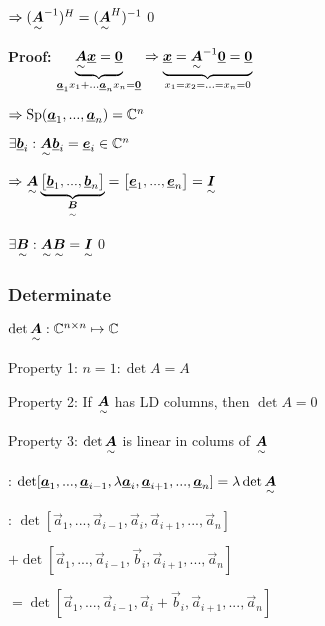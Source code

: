 $\Rightarrow(\ma{A}^{-1})^H=(\ma{A}^H)^{-1}$\qed


\textbf{Proof:} $\underbrace{\ma{A}\vec{x}=\vec{0}}_{\vec{a}_1x_1+...\vec{a}_nx_n=\vec{0}}
\Rightarrow \underbrace{\vec{x}=\ma{A}^{-1}\vec{0}=\vec{0}}_{x_1=x_2=...=x_n=0}$

$\Rightarrow \Sp(\vec{a}_1,...,\vec{a}_n)=\mathbb{C}^n$

$\exists \vec{b}_i: \ma{A}\vec{b}_i=\vec{e}_i \in \mathbb{C}^n$

$\Rightarrow \ma{A}\underbrace{\begin{bmatrix}\vec{b}_1,...,\vec{b}_n\end{bmatrix}}_{\ma{B}}=\begin{bmatrix}\vec{e}_1,...,\vec{e}_n\end{bmatrix}=\ma{I}$

$\exists \ma{B}: \ma{A}\ma{B}=\ma{I}$\qed


\subsubsection{Determinate}
$\det \ma{A}: \mathbb{C}^{n\times n}\mapsto \mathbb{C}$

Property 1: $n=1: \det A=A$

Property 2: If $\ma{A}$ has LD columns, then $\det A=0$

Property 3: $\det \ma{A}$ is linear in colums of $\ma{A}$

\quad {}: $\det [\vec{a}_1,...,\vec{a}_{i-1},\lambda\vec{a}_i,\vec{a}_{i+1},...,\vec{a}_n]=\lambda \det \ma{A}$

\quad {}: $\det [\vec{a}_1,...,\vec{a}_{i-1},\vec{a}_i,\vec{a}_{i+1},...,\vec{a}_n]$

\qquad\quad$+\det [\vec{a}_1,...,\vec{a}_{i-1},\vec{b}_i,\vec{a}_{i+1},...,\vec{a}_n]$

\qquad\quad$=\det [\vec{a}_1,...,\vec{a}_{i-1},\vec{a}_i+\vec{b}_i,\vec{a}_{i+1},...,\vec{a}_n]$


